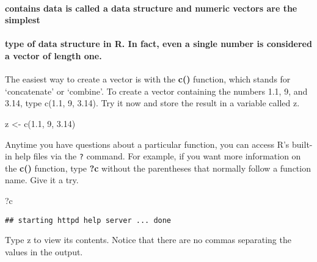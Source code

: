 \documentclass[
]{article}
\newenvironment{Shaded}{\begin{snugshade}}{\end{snugshade}}
\newcommand{\DecValTok}[1]{\textcolor[rgb]{0.00,0.00,0.81}{#1}}
\newcommand{\FloatTok}[1]{\textcolor[rgb]{0.00,0.00,0.81}{#1}}
\newcommand{\FunctionTok}[1]{\textcolor[rgb]{0.00,0.00,0.00}{#1}}
\newcommand{\NormalTok}[1]{#1}
\newcommand{\OtherTok}[1]{\textcolor[rgb]{0.56,0.35,0.01}{#1}}
\begin{document}
\hypertarget{contains-data-is-called-a-data-structure-and-numeric-vectors-are-the-simplest}{%
\paragraph{contains data is called a data structure and numeric vectors
are the
simplest}\label{contains-data-is-called-a-data-structure-and-numeric-vectors-are-the-simplest}}

\hypertarget{type-of-data-structure-in-r.-in-fact-even-a-single-number-is-considered-a-vector-of-length-one.}{%
\paragraph{type of data structure in R. In fact, even a single number is
considered a vector of length
one.}\label{type-of-data-structure-in-r.-in-fact-even-a-single-number-is-considered-a-vector-of-length-one.}}

The easiest way to create a vector is with the \textbf{c()} function,
which stands for `concatenate' or `combine'. To create a vector
containing the numbers 1.1, 9, and 3.14, type c(1.1, 9, 3.14). Try it
now and store the result in a variable called z.

\begin{Shaded}
\begin{Highlighting}[]
\NormalTok{z }\OtherTok{\textless{}{-}} \FunctionTok{c}\NormalTok{(}\FloatTok{1.1}\NormalTok{, }\DecValTok{9}\NormalTok{, }\FloatTok{3.14}\NormalTok{)}
\end{Highlighting}
\end{Shaded}

Anytime you have questions about a particular function, you can access
R's built-in help files via the \texttt{?} command. For example, if you
want more information on the \textbf{c()} function, type \textbf{?c}
without the parentheses that normally follow a function name. Give it a
try.

\begin{Shaded}
\begin{Highlighting}[]
\NormalTok{?c}
\end{Highlighting}
\end{Shaded}

\begin{verbatim}
## starting httpd help server ... done
\end{verbatim}

Type z to view its contents. Notice that there are no commas separating
the values in the output.
\end{document}
